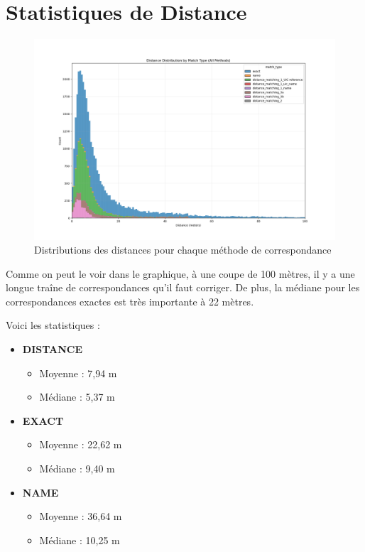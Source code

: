 \section{Statistiques de Distance}
\begin{figure}[h] 
    \centering
    \includegraphics[width=\textwidth]{../figures/plots/distance_distribution_all.png}
    \caption[Distribution des distances par méthode]{Distributions des distances pour chaque méthode de correspondance}
    \label{fig:sample}
\end{figure}
Comme on peut le voir dans le graphique, à une coupe de 100 mètres, il y a une longue traîne de correspondances qu'il faut corriger. De plus, la médiane pour les correspondances exactes est très importante à 22 mètres.

Voici les statistiques :

\begin{itemize}
    \item \textbf{DISTANCE}
    \begin{itemize}
        \item Moyenne : 7,94 m
        \item Médiane : 5,37 m
    \end{itemize}
    
    \item \textbf{EXACT}
    \begin{itemize}
        \item Moyenne : 22,62 m
        \item Médiane : 9,40 m
    \end{itemize}
    
    \item \textbf{NAME}
    \begin{itemize}
        \item Moyenne : 36,64 m
        \item Médiane : 10,25 m
    \end{itemize}
\end{itemize}


